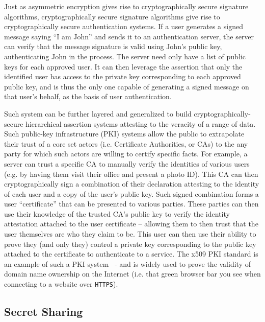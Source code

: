 Just as asymmetric encryption gives rise to cryptographically secure
signature algorithms, cryptographically secure signature algorithms
give rise to cryptographically secure authentication systems. If a
user generates a signed message saying ``I am John'' and sends it to
an authentication server, the server can verify that the message
signature is valid using John's public key, authenticating John in the
process. The server need only have a list of public keys for each
approved user. It can then leverage the assertion that only the
identified user has access to the private key corresponding to each
approved public key, and is thus the only one capable of generating a
signed message on that user's behalf, as the basis of user
authentication.

Such system can be further layered and generalized to build
cryptographically-secure hierarchical assertion systems attesting to
the veracity of a range of data. Such public-key infrastructure (PKI)
systems allow the public to extrapolate their trust of a core set
actors (i.e. Certificate Authorities, or CAs) to the any party for
which such actors are willing to certify specific facts. For example,
a server can trust a specific CA to manually verify the identities of
various users (e.g. by having them visit their office and present a
photo ID). This CA can then cryptographically sign a combination of
their declaration attesting to the identity of each user and a copy of
the user's public key. Such signed combination forms a user
``certificate'' that can be presented to various parties. These
parties can then use their knowledge of the trusted CA's public key to
verify the identity attestation attached to the user certificate --
allowing them to then trust that the user themselves are who they
claim to be. This user can then use their ability to prove they (and
only they) control a private key corresponding to the public key
attached to the certificate to authenticate to a service. The x509 PKI
standard is an example of such a PKI system~\cite{rfc5280} - and is
widely used to prove the validity of domain name ownership on the
Internet (i.e. that green browser bar you see when connecting to a
website over \texttt{HTTPS}).

\subsection{Secret Sharing}

